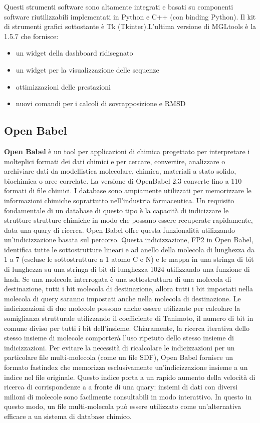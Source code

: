 Questi strumenti software sono altamente integrati e basati su componenti software riutilizzabili implementati in Python e C++ (con binding Python). Il kit di strumenti grafici sottostante è Tk (Tkinter).L'ultima versione di MGLtools è la 1.5.7 che fornisce:

\begin{itemize}
    \item un widget della dashboard ridisegnato
    \item un widget per la visualizzazione delle sequenze
    \item ottimizzazioni delle prestazioni
    \item nuovi comandi per i calcoli di sovrapposizione e RMSD
\end{itemize}

\subsection{Open Babel}\label{sec:2.1.4}
\textbf{Open Babel} è un tool per applicazioni di chimica progettato per interpretare i molteplici formati dei dati chimici e per cercare, convertire, analizzare o archiviare dati da modellistica molecolare, chimica, materiali a stato solido, biochimica o aree correlate.\newline
La versione di OpenBabel 2.3 converte fino a 110 formati di file chimici.\newline
I database sono ampiamente utilizzati per memorizzare le informazioni chimiche soprattutto nell'industria farmaceutica. Un requisito fondamentale di un database di questo tipo è la capacità di indicizzare le strutture strutture chimiche in modo che possano essere recuperate rapidamente, data una quary di ricerca. Open Babel offre questa funzionalità utilizzando un'indicizzazione basata sul percorso. Questa indicizzazione, FP2 in Open Babel, identifica tutte le sottostrutture lineari e ad anello della molecola di lunghezza da 1 a 7 (escluse le sottostrutture a 1 atomo C e N) e le mappa in una stringa di bit di lunghezza su una stringa di bit di lunghezza 1024 utilizzando una funzione di hash. Se una molecola interrogata è una sottostruttura di una molecola di destinazione, tutti i bit molecola di destinazione, allora tutti i bit impostati nella molecola di query saranno impostati anche nella molecola di destinazione. Le indicizzazioni
di due molecole possono anche essere utilizzate per calcolare la somiglianza strutturale utilizzando il coefficiente di Tanimoto, il numero di bit in comune diviso per tutti i bit dell'insieme.
Chiaramente, la ricerca iterativa dello stesso insieme di molecole comporterà l'uso ripetuto dello stesso insieme di indicizzazioni. Per evitare la necessità di ricalcolare le indicizzazioni per un particolare file multi-molecola (come un file SDF), Open Babel fornisce un formato fastindex che memorizza esclusivamente un'indicizzazione insieme a un indice nel file originale. Questo indice porta a un rapido aumento della velocità di ricerca di corrispondenze a a fronte di una quary: insiemi di dati con diversi milioni di molecole sono facilmente consultabili in modo interattivo. In questo in questo modo, un file multi-molecola può essere utilizzato come un'alternativa efficace a un sistema di database chimico\cite{o2011open}.

